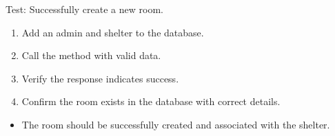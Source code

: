 \documentclass[letterpaper,10pt,english]{sphinxmanual}
\begin{document}
\begin{fulllineitems}
\label{\detokenize{test:test.test_room.test_create_room_success}}
\pysigstartsignatures
\pysiglinewithargsret
{}
{}
{}
\pysigstopsignatures
\sphinxAtStartPar
Test: Successfully create a new room.
\begin{description}
\begin{enumerate}
%
\item {} 
\sphinxAtStartPar
Add an admin and shelter to the database.

\item {} 
\sphinxAtStartPar
Call the  method with valid data.

\item {} 
\sphinxAtStartPar
Verify the response indicates success.

\item {} 
\sphinxAtStartPar
Confirm the room exists in the database with correct details.

\end{enumerate}

\begin{itemize}
\item {} 
\sphinxAtStartPar
The room should be successfully created and associated with the shelter.

\end{itemize}

\end{description}

\end{fulllineitems}

\end{document}
